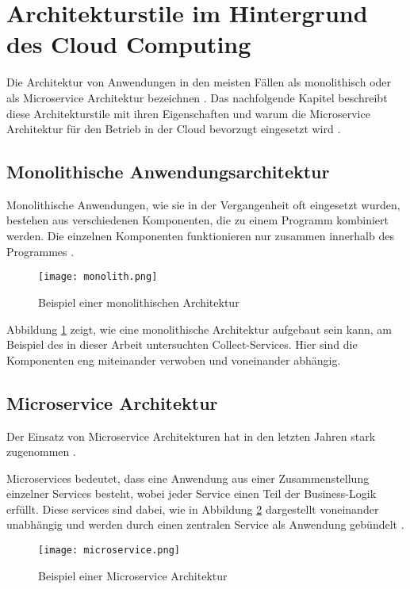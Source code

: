 \section{Architekturstile im Hintergrund des Cloud Computing}
Die Architektur von Anwendungen in den meisten Fällen als monolithisch oder als Microservice Architektur bezeichnen \cite[Vgl.][S. 150]{Gos2020}. Das nachfolgende Kapitel beschreibt diese Architekturstile mit ihren Eigenschaften und warum die Microservice Architektur für den Betrieb in der Cloud bevorzugt eingesetzt wird \cite[Vgl.][S. 1]{Villamizar2015}.

\subsection{Monolithische Anwendungsarchitektur}
Monolithische Anwendungen, wie sie in der Vergangenheit oft eingesetzt wurden, bestehen aus verschiedenen Komponenten, die zu einem Programm kombiniert werden. Die einzelnen Komponenten funktionieren nur zusammen innerhalb des Programmes \cite[Vgl.][S. 1]{Gos2020}.

\begin{figure}[H]
    \centering
    \texttt{[image: monolith.png]}
    \caption{Beispiel einer monolithischen Architektur \cite[Nachbildung angelehnt an][S. 150]{Gos2020}}
    \label{fig:monolith}
\end{figure}

Abbildung \ref{fig:monolith} zeigt, wie eine monolithische Architektur aufgebaut sein kann, am Beispiel des in dieser Arbeit untersuchten Collect-Services. Hier sind die Komponenten eng miteinander verwoben und voneinander abhängig.
\pagebreak

\subsection{Microservice Architektur}
Der Einsatz von Microservice Architekturen hat in den letzten Jahren stark zugenommen \cite[Vgl.][S. 150]{Gos2020}.

Microservices bedeutet, dass eine Anwendung aus einer Zusammenstellung einzelner Services besteht, wobei jeder Service einen Teil der Business-Logik erfüllt. Diese services sind dabei, wie in Abbildung \ref{fig:microservice} dargestellt voneinander unabhängig und werden durch einen zentralen Service als Anwendung gebündelt \cite[Vgl.][S. 150]{Gos2020}.

\begin{figure}[H]
    \centering
    \texttt{[image: microservice.png]}
    \caption{Beispiel einer Microservice Architektur \cite[Nachbildung angelehnt an][S. 150]{Gos2020}}
    \label{fig:microservice}
\end{figure}

